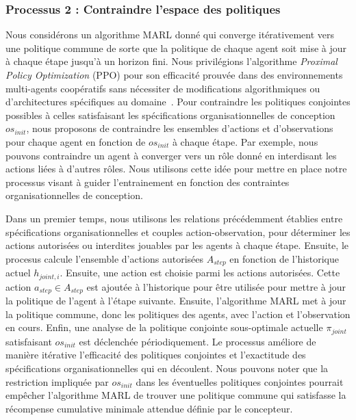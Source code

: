 \documentclass[contribution]{jfsma}
\newcounter{relation}
\begin{document}
\subsubsection{Processus 2 : Contraindre l'espace des politiques}

Nous considérons un algorithme MARL donné qui converge itérativement vers une politique commune de sorte que la politique de chaque agent soit mise à jour à chaque étape jusqu'à un horizon fini.
Nous privilégions l'algorithme \emph{Proximal Policy Optimization} (PPO) pour son efficacité prouvée dans des environnements multi-agents coopératifs sans nécessiter de modifications algorithmiques ou d'architectures spécifiques au domaine~\cite{Yu2022}.
Pour contraindre les politiques conjointes possibles à celles satisfaisant les spécifications organisationnelles de conception $os_{init}$, nous proposons de contraindre les ensembles d'actions et d'observations pour chaque agent en fonction de $os_{init}$ à chaque étape. Par exemple, nous pouvons contraindre un agent à converger vers un rôle donné en interdisant les actions liées à d’autres rôles. Nous utilisons cette idée pour mettre en place notre processus visant à guider l'entrainement en fonction des contraintes organisationnelles de conception.

Dans un premier temps, nous utilisons les relations précédemment établies entre spécifications organisationnelles et couples action-observation, pour déterminer les actions autorisées ou interdites jouables par les agents à chaque étape.
Ensuite, le procesus calcule l'ensemble d'actions autorisées $A_{step}$ en fonction de l'historique actuel $h_{joint,i}$. Ensuite, une action est choisie parmi les actions autorisées. Cette action $a_{step} \in A_{step}$ est ajoutée à l'historique pour être utilisée pour mettre à jour la politique de l'agent à l'étape suivante. Ensuite, l'algorithme MARL met à jour la politique commune, donc les politiques des agents, avec l'action et l'observation en cours.
Enfin, une analyse de la politique conjointe sous-optimale actuelle $\pi_{joint}$ satisfaisant $os_{init}$ est déclenchée périodiquement. Le processus améliore de manière itérative l’efficacité des politiques conjointes et l’exactitude des spécifications organisationnelles qui en découlent.
Nous pouvons noter que la restriction impliquée par $os_{init}$ dans les éventuelles politiques conjointes pourrait empêcher l'algorithme MARL de trouver une politique commune qui satisfasse la récompense cumulative minimale attendue définie par le concepteur.
\end{document}
